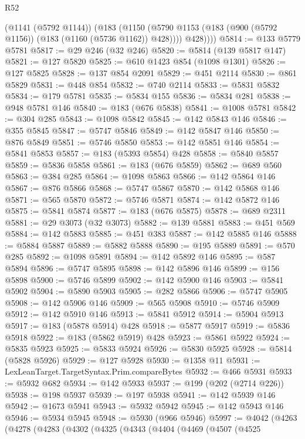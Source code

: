 \begin{lexlean}{R52}
\begin{coremodule}
          (@1141 (@5792 @1144))
          (@183
            (@1150 (@5790 @1153 (@183 (@900 (@5792 @1156)) (@183 (@1160 (@5736 @1162)) @428))))
            @428))))
@5814 := @133 @5779 @5781
@5817 := @29 @246 (@32 @246)
@5820 := @5814 (@139 @5817 @147)
@5821 := @127 @5820
@5825 := @610 @1423 @854 (@1098 @1301)
@5826 := @127 @5825
@5828 := @137 @854 @2091
@5829 := @451 @2114
@5830 := @861 @5829
@5831 := @448 @854
@5832 := @740 @2114
@5833 := @5831 @5832
@5834 := @179 @5781
@5835 := @5834 @155
@5836 := @5834 @281
@5838 := @948 @5781 @146
@5840 := @183 (@676 @5838)
@5841 := @1008 @5781
@5842 := @304 @285
@5843 := @1098 @5842
@5845 := @142 @5843 @146
@5846 := @355 @5845
@5847 := @5747 @5846
@5849 := @142 @5847 @146
@5850 := @876 @5849
@5851 := @5746 @5850
@5853 := @142 @5851 @146
@5854 := @5841 @5853
@5857 := @183 (@5393 @5854) @428
@5858 := @5840 @5857
@5859 := @5836 @5858
@5861 := @183 (@676 @5859)
@5862 := @689 @560
@5863 := @384 @285
@5864 := @1098 @5863
@5866 := @142 @5864 @146
@5867 := @876 @5866
@5868 := @5747 @5867
@5870 := @142 @5868 @146
@5871 := @565 @5870
@5872 := @5746 @5871
@5874 := @142 @5872 @146
@5875 := @5841 @5874
@5877 := @183 (@676 @5875)
@5878 := @689 @2311
@5881 := @29 @3073 (@32 @3073)
@5882 := @139 @5881
@5883 := @451 @569
@5884 := @142 @5883
@5885 := @451 @383
@5887 := @142 @5885 @146
@5888 := @5884 @5887
@5889 := @5882 @5888
@5890 := @195 @5889
@5891 := @570 @285
@5892 := @1098 @5891
@5894 := @142 @5892 @146
@5895 := @587 @5894
@5896 := @5747 @5895
@5898 := @142 @5896 @146
@5899 := @156 @5898
@5900 := @5746 @5899
@5902 := @142 @5900 @146
@5903 := @5841 @5902
@5904 := @5890 @5903
@5905 := @282 @5866
@5906 := @5747 @5905
@5908 := @142 @5906 @146
@5909 := @565 @5908
@5910 := @5746 @5909
@5912 := @142 @5910 @146
@5913 := @5841 @5912
@5914 := @5904 @5913
@5917 := @183 (@5878 @5914) @428
@5918 := @5877 @5917
@5919 := @5836 @5918
@5922 := @183 (@5862 @5919) @428
@5923 := @5861 @5922
@5924 := @5835 @5923
@5925 := @5833 @5924
@5926 := @5830 @5925
@5928 := @5814 (@5828 @5926)
@5929 := @127 @5928
@5930 := @1358 @11
@5931 := LexLeanTarget.TargetSyntax.Prim.compareBytes
@5932 := @466 @5931
@5933 := @5932 @682
@5934 := @142 @5933
@5937 := @199 (@202 (@2714 @226))
@5938 := @198 @5937
@5939 := @197 @5938
@5941 := @142 @5939 @146
@5942 := @1673 @5941
@5943 := @5932 @5942
@5945 := @142 @5943 @146
@5946 := @5934 @5945
@5948 := @5930 (@966 @5946)
@5997 := @4042
    (@4263
      (@4278
        (@4283
          (@4302
            (@4325
              (@4343
                (@4404
                  (@4469
                    (@4507
                      (@4525

\end{coremodule}
\end{lexlean}
